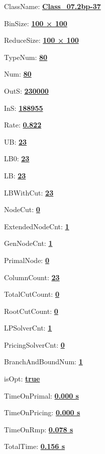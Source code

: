 \documentclass[11pt]{article}
\begin{document}
\pagestyle{empty}


ClassName: \underline{\textbf{Class_07.2bp-37}}
\par
BinSize: \underline{\textbf{100 × 100}}
\par
ReduceSize: \underline{\textbf{100 × 100}}
\par
TypeNum: \underline{\textbf{80}}
\par
Num: \underline{\textbf{80}}
\par
OutS: \underline{\textbf{230000}}
\par
InS: \underline{\textbf{188955}}
\par
Rate: \underline{\textbf{0.822}}
\par
UB: \underline{\textbf{23}}
\par
LB0: \underline{\textbf{23}}
\par
LB: \underline{\textbf{23}}
\par
LBWithCut: \underline{\textbf{23}}
\par
NodeCut: \underline{\textbf{0}}
\par
ExtendedNodeCnt: \underline{\textbf{1}}
\par
GenNodeCnt: \underline{\textbf{1}}
\par
PrimalNode: \underline{\textbf{0}}
\par
ColumnCount: \underline{\textbf{23}}
\par
TotalCutCount: \underline{\textbf{0}}
\par
RootCutCount: \underline{\textbf{0}}
\par
LPSolverCnt: \underline{\textbf{1}}
\par
PricingSolverCnt: \underline{\textbf{0}}
\par
BranchAndBoundNum: \underline{\textbf{1}}
\par
isOpt: \underline{\textbf{true}}
\par
TimeOnPrimal: \underline{\textbf{0.000 s}}
\par
TimeOnPricing: \underline{\textbf{0.000 s}}
\par
TimeOnRmp: \underline{\textbf{0.078 s}}
\par
TotalTime: \underline{\textbf{0.156 s}}
\par
\newpage


\end{document}
